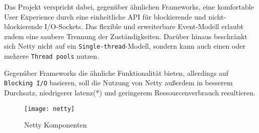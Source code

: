Das Projekt verspricht dabei, gegenüber ähnlichen Frameworks, eine komfortable User Experience durch eine einheitliche API für
blockierende und nicht-blockierende I/O-Sockets. Das flexible und erweiterbare Event-Modell erlaubt zudem eine saubere Trennung der Zuständigkeiten.
Darüber hinaus beschränkt sich Netty nicht auf ein \verb|Single-thread|-Modell, sondern kann auch einen oder mehrere \verb|Thread pools| nutzen.

Gegenüber Frameworks die ähnliche Funktionalität bieten, allerdings auf \verb|Blocking I/O| basieren,
soll die Nutzung von Netty außerdem
in besserem Durchsatz, niedrigerer \Gls{latenz}(*) und geringerem Ressourcenverbrauch resultieren. \parencite{Netty}

\begin{figure}[h!]
  \centering
  \texttt{[image: netty]}
  \caption{Netty Komponenten \parencite{Netty}}
  \label{fig:netty}
\end{figure}